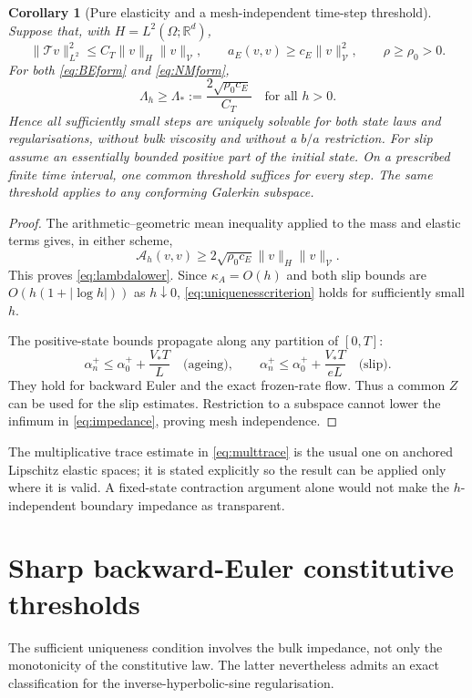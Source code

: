 \documentclass[11pt,a4paper]{article}
\newtheorem{corollary}[theorem]{Corollary}
\theoremstyle{definition}\newtheorem{definition}[theorem]{Definition}
\theoremstyle{remark}\newtheorem{remark}[theorem]{Remark}
\newcommand{\R}{\mathbb R}
\newcommand{\norm}[1]{\lVert #1\rVert}
\newcommand{\A}{\mathcal A}
\newcommand{\V}{\mathcal V}
\newcommand{\tr}{\mathcal T}
\numberwithin{equation}{section}
\begin{document}
\begin{corollary}[Pure elasticity and a mesh-independent time-step threshold]\label{cor:uniformh}
Suppose that, with $H=L^2(\Omega;\R^d)$,
\begin{equation}\label{eq:multtrace}
 \norm{\tr v}_{L^2}^2\le C_T\norm v_H\norm v_\V,\qquad
 a_E(v,v)\ge c_E\norm v_\V^2,\qquad \rho\ge\rho_0>0.
\end{equation}
For both \eqref{eq:BEform} and \eqref{eq:NMform},
\begin{equation}\label{eq:lambdalower}
 \Lambda_h\ge\Lambda_*:=\frac{2\sqrt{\rho_0c_E}}{C_T}
 \quad\text{for all }h>0.
\end{equation}
Hence all sufficiently small steps are uniquely solvable for both state laws and regularisations, without bulk viscosity and without a $b/a$ restriction. For slip assume an essentially bounded positive part of the initial state. On a prescribed finite time interval, one common threshold suffices for every step. The same threshold applies to any conforming Galerkin subspace.
\end{corollary}
\begin{proof}
The arithmetic--geometric mean inequality applied to the mass and elastic terms gives, in either scheme,
\[
 \A_h(v,v)\ge2\sqrt{\rho_0c_E}\norm v_H\norm v_\V.
\]
This proves \eqref{eq:lambdalower}. Since $\kappa_A=O(h)$ and both slip bounds are $O(h(1+|\log h|))$ as $h\downarrow0$, \eqref{eq:uniquenesscriterion} holds for sufficiently small $h$.

The positive-state bounds propagate along any partition of $[0,T]$:
\begin{equation}\label{eq:statepropagation}
 \alpha_n^+\le\alpha_0^++\frac{V_*T}{L}\quad\text{(ageing)},\qquad
 \alpha_n^+\le\alpha_0^++\frac{V_*T}{eL}\quad\text{(slip)}.
\end{equation}
They hold for backward Euler and the exact frozen-rate flow. Thus a common $Z$ can be used for the slip estimates. Restriction to a subspace cannot lower the infimum in \eqref{eq:impedance}, proving mesh independence.
\end{proof}
The multiplicative trace estimate in \eqref{eq:multtrace} is the usual one on anchored Lipschitz elastic spaces; it is stated explicitly so the result can be applied only where it is valid. A fixed-state contraction argument alone would not make the $h$-independent boundary impedance as transparent.

\section{Sharp backward-Euler constitutive thresholds}\label{sec:thresholds}
The sufficient uniqueness condition involves the bulk impedance, not only the monotonicity of the constitutive law. The latter nevertheless admits an exact classification for the inverse-hyperbolic-sine regularisation.
\end{document}

